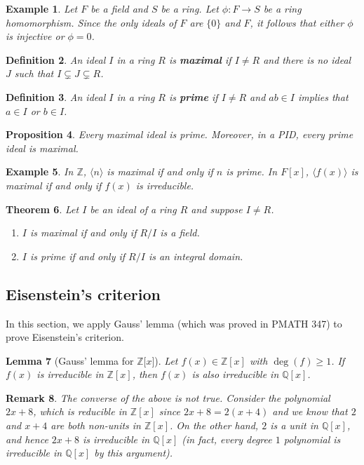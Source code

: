 \documentclass[10pt]{article}
\newcommand{\Z}{\mathbb{Z}}
\newcommand{\Q}{\mathbb{Q}}
\theoremstyle{newstyle}
\newtheorem{thm}{Theorem}[section]
\newtheorem{lemma}[thm]{Lemma}
\newtheorem{remark}[thm]{Remark}
\newtheorem{prop}[thm]{Proposition}
\newtheorem{defn}[thm]{Definition}
\newtheorem{exmp}[thm]{Example}
\begin{document}
\begin{exmp}
Let $F$ be a field and $S$ be a ring. Let $\phi : F \to S$ be a ring homomorphism. Since the 
only ideals of $F$ are $\{0\}$ and $F$, it follows that either $\phi$ is injective or $\phi = 0$.
\end{exmp}

\begin{defn}
An ideal $I$ in a ring $R$ is {\bf maximal} if $I \neq R$ and there is no ideal $J$ 
such that $I \subsetneq J \subsetneq R$.
\end{defn}

\begin{defn}
An ideal $I$ in a ring $R$ is {\bf prime} if $I \neq R$ and $ab \in I$ implies that $a \in I$ 
or $b \in I$.
\end{defn}

\begin{prop}
Every maximal ideal is prime. Moreover, in a PID, every prime ideal is maximal.
\end{prop}

\begin{exmp}
In $\Z$, $\langle n \rangle$ is maximal if and only if $n$ is prime. In $F[x]$, $\langle f(x) \rangle$ 
is maximal if and only if $f(x)$ is irreducible.
\end{exmp}

\begin{thm}
Let $I$ be an ideal of a ring $R$ and suppose $I \neq R$.
\begin{enumerate}[(1)]
    \item $I$ is maximal if and only if $R/I$ is a field.
    \item $I$ is prime if and only if $R/I$ is an integral domain.
\end{enumerate}
\end{thm}

\subsection{Eisenstein's criterion}

In this section, we apply Gauss' lemma (which was proved in PMATH 347) to prove Eisenstein's criterion.

\begin{lemma}[Gauss' lemma for $\Z [x{]}$]
Let $f(x) \in \Z[x]$ with $\deg(f) \geq 1$. If $f(x)$ is irreducible in $\Z[x]$, then $f(x)$ is 
also irreducible in $\Q[x]$.
\end{lemma}

\begin{remark}
The converse of the above is not true. Consider the polynomial $2x+8$, which is reducible 
in $\Z[x]$ since $2x+8 = 2(x+4)$ and we know that $2$ and $x+4$ are both non-units in $\Z[x]$. 
On the other hand, $2$ is a unit in $\Q[x]$, and hence $2x+8$ is irreducible in $\Q[x]$ 
(in fact, every degree $1$ polynomial is irreducible in $\Q[x]$ by this argument).
\end{remark}
\end{document}
